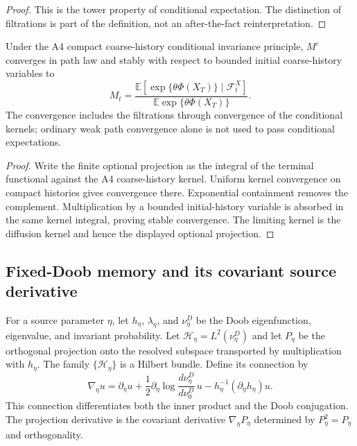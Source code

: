 \begin{proof}
This is the tower property of conditional expectation.  The distinction of
filtrations is part of the definition, not an after-the-fact reinterpretation.
\end{proof}

\begin{theorem}
\label{thm:r7-c2-optional}
Under the A4 compact coarse-history conditional invariance principle,
$M^\varepsilon$ converges in path law and stably with respect to bounded
initial coarse-history variables to
\[
 M_t=
 \frac{\mathbb E[\exp\{\theta\Phi(X_T)\}
      \mid\mathcal F_t^X]}
      {\mathbb E\exp\{\theta\Phi(X_T)\}}.
\]
The convergence includes the filtrations through convergence of the conditional
kernels; ordinary weak path convergence alone is not used to pass conditional
expectations.
\end{theorem}

\begin{proof}
Write the finite optional projection as the integral of the terminal
functional against the A4 coarse-history kernel.  Uniform kernel convergence
on compact histories gives convergence there.  Exponential containment removes
the complement.  Multiplication by a bounded initial-history variable is
absorbed in the same kernel integral, proving stable convergence.  The limiting
kernel is the diffusion kernel and hence the displayed optional projection.
\end{proof}

\subsection{Fixed-Doob memory and its covariant source derivative}

For a source parameter $\eta$, let
$h_\eta$, $\lambda_\eta$, and $\nu_\eta^D$ be the Doob eigenfunction,
eigenvalue, and invariant probability.  Let
$\mathcal H_\eta=L^2(\nu_\eta^D)$ and let $P_\eta$ be the orthogonal projection
onto the resolved subspace transported by multiplication with $h_\eta$.
The family $\{\mathcal H_\eta\}$ is a Hilbert bundle.  Define its connection by
\[
 \nabla_\eta u
 =\partial_\eta u+\frac12
  \partial_\eta\log\frac{d\nu_\eta^D}{d\nu_0^D}\,u
 -h_\eta^{-1}(\partial_\eta h_\eta)u.
\]
This connection differentiates both the inner product and the Doob
conjugation.  The projection derivative is the covariant derivative
$\nabla_\eta P_\eta$ determined by $P_\eta^2=P_\eta$ and orthogonality.

